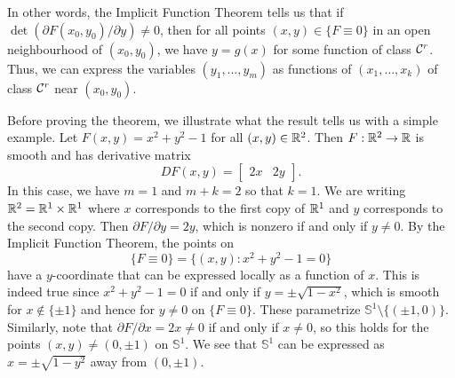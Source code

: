 In other words, the Implicit Function Theorem tells us that if 
$\det(\partial F(x_0, y_0)/\partial y) \neq 0$, then 
for all points $(x, y) \in \{F \equiv 0\}$ in an open neighbourhood of 
$(x_0, y_0)$, we have $y = g(x)$ for some function of class ${\cal C}^r$. Thus, 
we can express the variables $(y_1, \dots, y_m)$ as functions of 
$(x_1, \dots, x_k)$ of class ${\cal C}^r$ near $(x_0, y_0)$. 

Before proving the theorem, we illustrate what the result tells us 
with a simple example. Let $F(x, y) = x^2 + y^2 - 1$ for all $(x, y) \in \mathbb{R}^2$. 
Then $F : \mathbb{R}^2 \to \mathbb{R}$ is smooth and has derivative matrix 
\[ DF(x, y) = \begin{bmatrix}
    2x & 2y 
\end{bmatrix}. \] 
In this case, we have $m = 1$ and $m + k = 2$ so that $k = 1$. We are writing 
$\mathbb{R}^2 = \mathbb{R}^1 \times \mathbb{R}^1$ where $x$ corresponds to the first copy of $\mathbb{R}^1$ 
and $y$ corresponds to the second copy. Then $\partial F/\partial y = 2y$, 
which is nonzero if and only if $y \neq 0$. By the Implicit Function 
Theorem, the points on 
\[ \{F \equiv 0\} = \{(x, y) : x^2 + y^2 - 1 = 0\} \] 
have a $y$-coordinate that can be expressed locally as a function of $x$. 
This is indeed true since $x^2 + y^2 - 1 = 0$ if and only if 
$y = \pm\sqrt{1-x^2}$, which is smooth for $x \notin \{\pm1\}$ and hence 
for $y \neq 0$ on $\{F \equiv 0\}$. These parametrize $\mathbb{S}^1 
\setminus \{(\pm1, 0)\}$. Similarly, note that 
$\partial F/\partial x = 2x \neq 0$ if and only if $x \neq 0$, so this 
holds for the points $(x, y) \neq (0, \pm1)$ on $\mathbb{S}^1$. We see that 
$\mathbb{S}^1$ can be expressed as $x = \pm\sqrt{1-y^2}$ away from 
$(0, \pm1)$.

